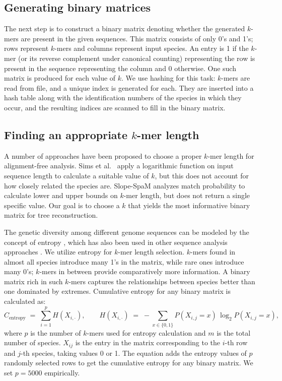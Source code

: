 \documentclass[11pt]{article}
\begin{document}
\subsection{Generating binary matrices}

The next step is to construct a binary matrix denoting whether the generated $k$-mers are present in the given sequences. This matrix consists of only 0's and 1's; rows represent $k$-mers and columns represent input species. An entry is 1 if the $k$-mer (or its reverse complement under canonical counting) representing the row is present in the sequence representing the column and 0 otherwise. One such matrix is produced for each value of $k$. We use hashing for this task: $k$-mers are read from file, and a unique index is generated for each. They are inserted into a hash table along with the identification numbers of the species in which they occur, and the resulting indices are scanned to fill in the binary matrix.

\subsection{Finding an appropriate $k$-mer length}

A number of approaches have been proposed to choose a proper $k$-mer length for alignment-free analysis. Sims et al.\ \cite{sims2009ffpsize} apply a logarithmic function on input sequence length to calculate a suitable value of $k$, but this does not account for how closely related the species are. Slope-SpaM \cite{rohling2020slopespam} analyzes match probability to calculate lower and upper bounds on $k$-mer length, but does not return a single specific value. Our goal is to choose a $k$ that yields the most informative binary matrix for tree reconstruction.

The genetic diversity among different genome sequences can be modeled by the concept of entropy \cite{shannon1948entropy}, which has also been used in other sequence analysis approaches \cite{vinga2003entropy,schmitt2011entropy}. We utilize entropy for $k$-mer length selection. $k$-mers found in almost all species introduce many 1's in the matrix, while rare ones introduce many 0's; $k$-mers in between provide comparatively more information. A binary matrix rich in such $k$-mers captures the relationships between species better than one dominated by extremes. Cumulative entropy for any binary matrix is calculated as:
\begin{equation}
C_{\text{entropy}} \;=\; \sum_{i=1}^{p} H(X_{i,\cdot}),\qquad H(X_{i,\cdot}) \;=\; -\!\!\sum_{x\in\{0,1\}} P(X_{i,j}=x)\,\log_2 P(X_{i,j}=x),
\label{eq:entropy}
\end{equation}
where $p$ is the number of $k$-mers used for entropy calculation and $m$ is the total number of species. $X_{ij}$ is the entry in the matrix corresponding to the $i$-th row and $j$-th species, taking values 0 or 1. The equation adds the entropy values of $p$ randomly selected rows to get the cumulative entropy for any binary matrix. We set $p = 5000$ empirically.
\end{document}
